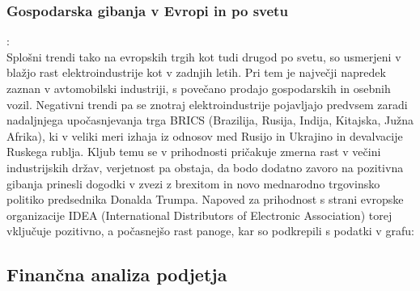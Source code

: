 \documentclass[12pt,a4paper]{amsart}
\theoremstyle{definition} %
\theoremstyle{plain} %
\begin{document}
\subsubsection{Gospodarska gibanja v Evropi in po svetu}:\\
Splošni trendi tako na evropskih trgih kot tudi drugod po svetu, so usmerjeni v blažjo rast elektroindustrije kot v zadnjih letih. Pri tem je največji napredek zaznan v avtomobilski industriji, s povečano prodajo gospodarskih in osebnih vozil. Negativni trendi pa se znotraj elektroindustrije pojavljajo predvsem zaradi nadaljnjega upočasnjevanja trga BRICS (Brazilija, Rusija, Indija, Kitajska, Južna Afrika), ki v veliki meri izhaja iz odnosov med Rusijo in Ukrajino in devalvacije Ruskega rublja. %
Kljub temu se v prihodnosti pričakuje zmerna rast v večini industrijskih držav, verjetnost pa obstaja, da bodo dodatno zavoro na pozitivna gibanja prinesli dogodki v zvezi z brexitom in novo mednarodno trgovinsko politiko predsednika Donalda Trumpa. Napoved za prihodnost s strani evropske organizacije IDEA (International Distributors of Electronic Association) torej vključuje pozitivno, a počasnejšo rast panoge, kar so podkrepili s podatki v grafu:


\subsection{Finančna analiza podjetja}
\end{document}
